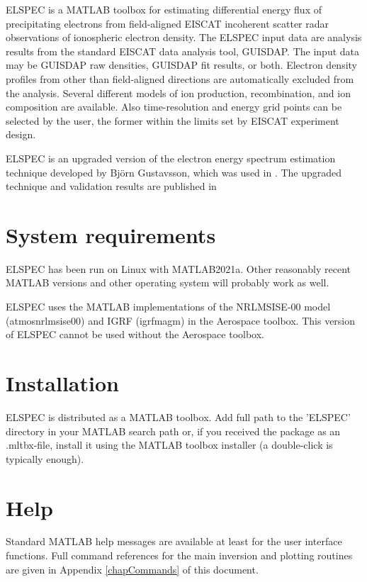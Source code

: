 \documentclass[12pt,a4paper]{report}
\begin{document}
ELSPEC is a MATLAB toolbox for estimating differential energy flux of precipitating electrons from field-aligned EISCAT incoherent scatter radar observations of ionospheric electron density. The ELSPEC input data are analysis results from the standard EISCAT data analysis tool, GUISDAP. The input data may be GUISDAP raw densities, GUISDAP fit results, or both. %
Electron density profiles from other than field-aligned directions are automatically excluded from the analysis. Several different models of ion production, recombination, and ion composition are available. Also time-resolution and energy grid points can be selected by the user, the former within the limits set by EISCAT experiment design. 


ELSPEC is an upgraded version of the electron energy spectrum estimation technique developed by Bj{\"o}rn Gustavsson, which was used in \citep{dahlgren2011}. The upgraded technique and validation results are published in \citep{virtanen2018}

\section{System requirements}

ELSPEC has been run on Linux with MATLAB2021a. Other reasonably recent MATLAB versions and other operating system will probably work as well. 

ELSPEC uses the MATLAB implementations of the NRLMSISE-00 model (atmosnrlmsise00) and IGRF (igrfmagm) in the Aerospace toolbox. This version of ELSPEC cannot be used without the Aerospace toolbox. 

\section{Installation}

ELSPEC is distributed as a MATLAB toolbox. Add full path to the 'ELSPEC' directory in your MATLAB search path or, if you received the package as an .mltbx-file, install it using the MATLAB toolbox installer (a double-click is typically enough).


\section{Help}\label{help}

Standard MATLAB help messages are available at least for the user interface functions. Full command references for the main inversion and plotting routines are given in Appendix \ref{chapCommands} of this document. 
\end{document}
